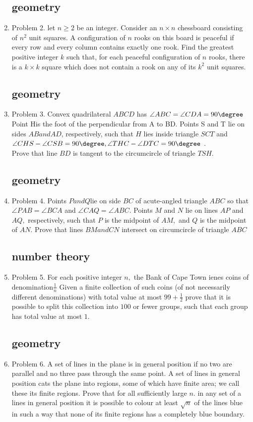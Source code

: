 \documentclass{article}
\begin{document}
\begin{enumerate}
		\subsection*{geometry}	
\item Problem 2. let $n\geq 2$ be an integer. Consider an $n\times n$ chessboard consisting of $n^2$ unit squares. A configuration of $n$ rooks on this board is peaceful if every row and every column contains exactly one rook. Find the greatest positive integer $k$ such that, for each peaceful configuration of $n$ rooks, there is a $k\times k$ square which does not contain a rook on any of its $k^2$ unit squares.
	\subsection*{geometry}
\item Problem 3. Convex quadrilateral $ABCD$ has $\angle ABC= \angle CDA = 90 \degree$ Point His the foot of the perpendicular from A to BD. Points S and T lie on sides $AB and AD$, respectively, such that $H$ lies inside triangle $SCT$ and $\angle CHS- \angle CSB = 90 \degree , \angle THC- \angle DTC = 90\degree$ .\\
	Prove that line $BD$ is tangent to the circumcircle of triangle $TSH$.
		\subsection*{geometry}
\item Problem 4. Points $P and Q$lie on side $BC$ of acute-angled triangle $ABC$ so that $\angle PAB= \angle BCA$ and $\angle CAQ=\angle ABC.$ Points $M$ and $N$ lie on lines $AP$ and $AQ,$ respectively, such that $P$ is the midpoint of $AM,$ and $Q$ is the midpoint of $AN.$ Prove that lines $BM and CN$ intersect on circumcircle of triangle $ABC$
	\subsection*{number theory}

\item Problem 5. For each positive integer $n,$ the Bank of Cape Town ienes coins of denomination$\frac{1}{n}$ Given a finite collection of such coins (of  not  necessarily  different  denominations) with total value at most $99 +\frac{1}{2}$ prove that it is possible to split this collection into $100$ or fewer groups, such that each group has total value at most $1$.
	\subsection*{geometry}
\item Problem 6. A set of lines in the plane is in general position if no two are parallel and no three pass through the same point. A set of lines in general position cats the plane into regions, some of which have finite area; we call these its finite regions. Prove that for all sufficiently large $n$. in any set of a lines in general position it is possible to colour at least $\sqrt n$ of the lines blue in such a way that none of its finite regions has a completely blue boundary.\\


\end{enumerate}
\end{document}
